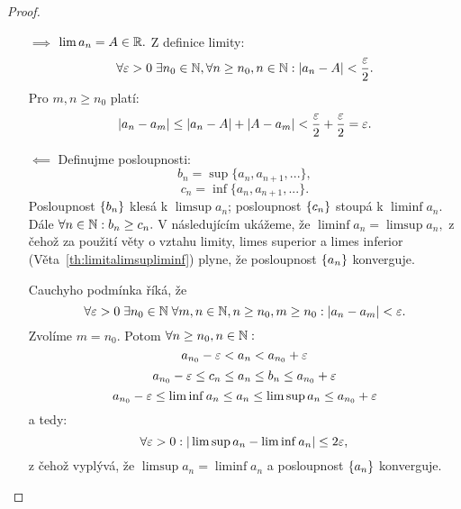 \begin{proof}
    \leavevmode
    \begin{itemize}
        \item[$\implies$] $\lim a_n = A \in \mathbb{R}.$ Z definice limity:
            $$\forall \varepsilon > 0 \; \exists n_0 \in \mathbb{N}, \forall n \geq n_0, n\in \mathbb{N}:
            |a_n - A| < \frac{\varepsilon}{2}.$$
            Pro $m,n \geq n_0$ platí:
            $$|a_n - a_m| \leq |a_n -A | + |A - a_m| < \frac{\varepsilon}{2} + \frac{\varepsilon}{2}
            = \varepsilon.$$
        \item[$\impliedby$] Definujme posloupnosti:
            $$b_n = \sup\{a_n, a_{n+1}, ...\},$$
            $$c_n = \inf\{a_n, a_{n+1}, ...\}.$$
            Posloupnost $\left\{b_n\right\}$ klesá k $\limsup a_n$; posloupnost $\left\{c_n\right\}$
            stoupá k $\liminf a_n.$ Dále $\forall n \in \mathbb{N}: b_n \geq c_n.$
            V následujícím ukážeme, že $\liminf a_n = \limsup a_n,$ z čehož za
            použití věty o vztahu limity, limes superior a limes inferior 
            (Věta~\ref{th:limitalimsupliminf}) plyne, že posloupnost 
            $\left\{a_n\right\}$ konverguje.

            Cauchyho podmínka říká, že
            $$\forall \varepsilon > 0 \; \exists n_0 \in \mathbb{N} \; \forall m,n \in \mathbb{N}, n \geq n_0, 
            m \geq n_0: |a_n - a_m| < \varepsilon.$$
            Zvolíme $m = n_0.$ Potom $\forall n \geq n_0, n\in\mathbb{N}:$
                $$a_{n_0} - \varepsilon < a_n < a_{n_0} + \varepsilon$$
                $$a_{n_0} - \varepsilon \leq c_n \leq a_n \leq b_n \leq a_{n_0} + \varepsilon$$
                $$a_{n_0} - \varepsilon \leq \liminf a_n \leq a_n \leq \limsup a_n \leq a_{n_0} + \varepsilon$$
            a tedy:
            $$\forall \varepsilon> 0: |\limsup a_n - \liminf a_n| \leq 2\varepsilon,$$
            z čehož vyplývá, že $\limsup a_n = \liminf a_n$ a posloupnost 
            $\left\{a_n\right\}$ konverguje.

    \end{itemize}
\end{proof}

